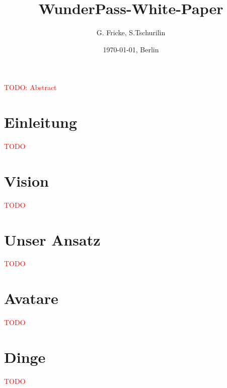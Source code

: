 \documentclass[11pt]{scrartcl}
\title{WunderPass-White-Paper}
\author{G. Fricke, S.Tschurilin}
\date{\today{}, Berlin}
\newcommand\todo[1]{\textcolor{red}{#1}}
\begin{document}
\maketitle




\todo{TODO: Abstract}
 
\section{Einleitung}
\label{sec:einleitung}
\todo{TODO}





\section{Vision}
\label{sec:vision}
\todo{TODO}





\section{Unser Ansatz}
\label{sec:ansatz}
\todo{TODO}





\section{Avatare}
\label{sec:avatar}
\todo{TODO}





\section{Dinge}
\label{sec:dinge}
\todo{TODO}
\end{document}
